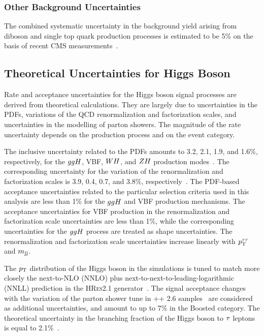 \subsubsection{Other Background Uncertainties}
The combined systematic uncertainty in the background yield arising from diboson and single top quark production 
processes is estimated to be 5\%
on the basis of recent CMS measurements~\cite{Khachatryan:2016tgp,Sirunyan:2016cdg}.


\subsection{Theoretical Uncertainties for Higgs Boson}
Rate and acceptance uncertainties for the Higgs boson signal processes are derived from theoretical calculations.
They are largely due to uncertainties in the PDFs, variations of the QCD renormalization and factorization scales,
and uncertainties in the modelling of parton showers.
The magnitude of the rate uncertainty depends on the production process and on the event category.

The inclusive uncertainty related to the PDFs amounts to 3.2, 2.1, 1.9, and 1.6\%, respectively, for 
the $ ggH $, VBF, $WH$, and $ZH$ production modes~\cite{deFlorian:2016spz}. The
corresponding uncertainty for the variation of the renormalization and factorization scales is 
3.9, 0.4, 0.7, and 3.8\%, respectively~\cite{deFlorian:2016spz}.
The PDF-based acceptance uncertainties related to the particular selection criteria used in this analysis are less 
than 1\% for the $ggH$ and VBF production mechanisms. The acceptance uncertainties for VBF production 
in the renormalization and factorization scale uncertainties are less than 1\%, while the corresponding 
uncertainties for the $ggH$ process are treated as shape uncertainties. The renormalization and 
factorization scale uncertainties increase linearly with $p_\mathrm{T}^{\tau\tau}$ and $m_\mathrm{jj}$.

The $p_\mathrm{T}$ distribution of the Higgs boson in the {} simulations is tuned to match more closely
the next-to-NLO (NNLO) plus next-to-next-to-leading-logarithmic (NNLL) prediction in the
\textsc{HRes2.1} generator~\cite{deFlorian:2012mx,Grazzini:2013mca}.
The signal acceptance changes with the variation of the parton shower tune in \HERWIG++ 2.6 samples~\cite{Bellm:2013hwb} 
are considered as additional uncertainties, and amount to up to 7\% in the Boosted category. The theoretical 
uncertainty in the branching fraction of the Higgs boson to $\tau$ leptons is equal to 2.1\%~\cite{deFlorian:2016spz}.

